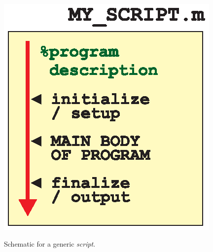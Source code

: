 \documentclass{tufte-book} %
\begin{document}
\begin{marginfigure}[-0.0in]
\includegraphics[width=\linewidth]{ch0-script.eps}
\caption{Schematic for a generic \textit{script}.}
\label{fig:ch0-script}
\end{marginfigure}
\end{document}

